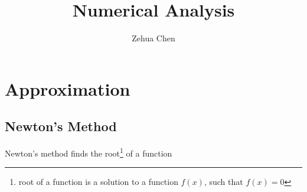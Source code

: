 \documentclass{../../shared/latex/notes}
\title{Numerical Analysis}
\author{Zehua Chen}
\begin{document}
  \maketitle
  \tableofcontents

  \chapter{Approximation}

    \section{Newton's Method}

      Newton's method finds the root\footnote{root of a function is a
      solution to a function $ f(x) $, such that $ f(x) = 0 $} of a function
\end{document}
